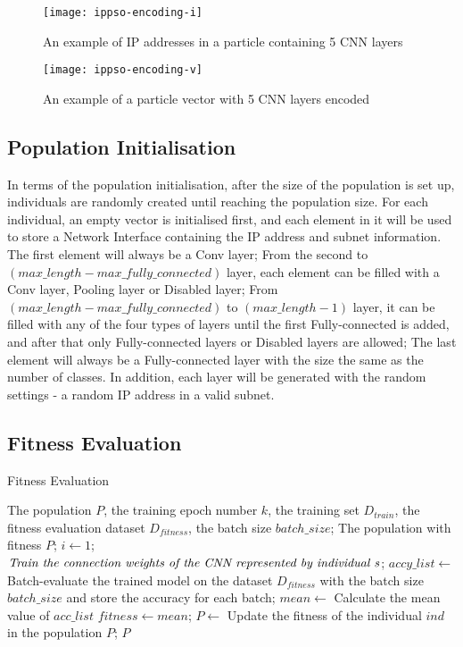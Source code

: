 \documentclass[conference]{IEEEtran}
\begin{document}
\begin{figure}[!t]
	\centering
	\texttt{[image: ippso-encoding-i]}
	\caption{An example of IP addresses in a particle containing 5 CNN layers}
	\label{fig:ParticleIP}
\end{figure}

\begin{figure}[!t]
	\centering
	\texttt{[image: ippso-encoding-v]}
	\caption{An example of a particle vector with 5 CNN layers encoded}
	\label{fig:ParticleVector}
\end{figure}

\subsection{Population Initialisation}


In terms of the population initialisation, after the size of the population is set up, individuals are randomly created until reaching the population size.
For each individual, an empty vector is initialised first, and each element in it will be used to store a Network Interface containing the IP address and subnet information. The first element will always be a Conv layer; From the second to $(max\_length-max\_fully\_connected)$ layer, each element can be filled with a Conv layer, Pooling layer or Disabled layer; From $(max\_length-max\_fully\_connected)$ to $(max\_length-1)$ layer, it can be filled with any of the four types of layers until the first Fully-connected is added, and after that only Fully-connected layers or Disabled layers are allowed; The last element will always be a Fully-connected layer with the size the same as the number of classes. In addition, each layer will be generated with the random settings - a random IP address in a valid subnet.


\subsection{Fitness Evaluation}
\begin{algorithm}
	\caption{Fitness Evaluation}
	\label{alg:fitness}
	\begin{algorithmic}
		\renewcommand{\algorithmicrequire}{\textbf{Input:}}
		\renewcommand{\algorithmicensure}{\textbf{Output:}}
		\REQUIRE The population $P$, the training epoch number $k$, the training set $D_{train}$, the fitness evaluation dataset $D_{fitness}$, the batch size $batch\_size$;
		\ENSURE The population with fitness $P$;
			\STATE $i \leftarrow 1$;
				\STATE $\textit{Train the connection weights of the CNN } \newline \textit{represented by individual s}$;
			\ENDWHILE
			\STATE $accy\_list \leftarrow$ Batch-evaluate the trained model on the dataset $D_{fitness}$ with the batch size $batch\_size$ and store the accuracy for each batch;
			\STATE $mean \leftarrow$ Calculate the mean value of  $acc\_list$
			\STATE $fitness \leftarrow mean$;
			\STATE $P \leftarrow$ Update the fitness of the individual $ind$ in the population $P$;
		\ENDFOR
		\RETURN $P$
	\end{algorithmic}
\end{algorithm}
\end{document}
